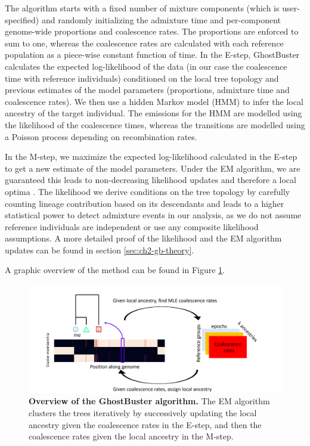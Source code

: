 The algorithm starts with a fixed number of mixture components (which is user-specified) and randomly initializing the admixture time and per-component genome-wide proportions and coalescence rates. 
%
The proportions are enforced to sum to one, whereas the coalescence rates are calculated with each reference population as a piece-wise constant function of time. 
%
In the E-step, GhostBuster calculates the expected log-likelihood of the data (in our case the coalescence time with reference individuals) conditioned on the local tree topology and previous estimates of the model parameters (proportions, admixture time and coalescence rates). 
%
We then use a hidden Markov model (HMM) to infer the local ancestry of the target individual.
%
The emissions for the HMM are modelled using the likelihood of the coalescence times, whereas the transitions are modelled using a Poisson process depending on recombination rates. 

In the M-step, we maximize the expected log-likelihood calculated in the E-step to get a new estimate of the model parameters. 
%
Under the EM algorithm, we are guaranteed this leads to non-decreasing likelihood updates and therefore a local optima \cite{dempster1977maximum}. 
%
The likelihood we derive conditions on the tree topology by carefully counting lineage contribution based on its descendants and leads to a higher statistical power to detect admixture events in our analysis, as we do not assume reference individuals are independent or use any composite likelihood assumptions.
%
A more detailed proof of the likelihood and the EM algorithm updates can be found in section \ref{sec:ch2-gb-theory}. 

A graphic overview of the method can be found in Figure \ref{fig:gb_overview}.

\begin{figure}[h!]
    \centering
    \includegraphics[scale=0.5]{figures/ghostbuster_method.PNG}
    \caption{\textbf{Overview of the GhostBuster algorithm.} The EM algorithm clusters the trees iteratively by successively updating the local ancestry given the coalescence rates in the E-step, and then the coalescence rates given the local ancestry in the M-step. }
    \label{fig:gb_overview}
\end{figure}



